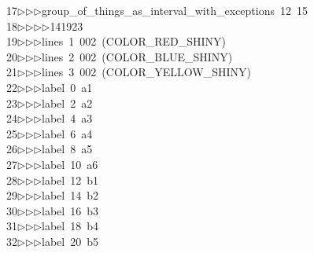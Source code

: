 \begin{tabbing}
17\>$\triangleright$\>$\triangleright$\>$\triangleright$\>group\_of\_things\_as\_interval\_with\_exceptions\ 12\ 15\ \\[0pt]
18\>$\triangleright$\>$\triangleright$\>$\triangleright$\>$\triangleright$\>141923\ \\[0pt]
19\>$\triangleright$\>$\triangleright$\>$\triangleright$\>lines\ 1\ 002\ (COLOR\_RED\_SHINY)\ \\[0pt]
20\>$\triangleright$\>$\triangleright$\>$\triangleright$\>lines\ 2\ 002\ (COLOR\_BLUE\_SHINY)\ \\[0pt]
21\>$\triangleright$\>$\triangleright$\>$\triangleright$\>lines\ 3\ 002\ (COLOR\_YELLOW\_SHINY)\ \\[0pt]
22\>$\triangleright$\>$\triangleright$\>$\triangleright$\>label\ 0\ a1\ \\[0pt]
23\>$\triangleright$\>$\triangleright$\>$\triangleright$\>label\ 2\ a2\ \\[0pt]
24\>$\triangleright$\>$\triangleright$\>$\triangleright$\>label\ 4\ a3\ \\[0pt]
25\>$\triangleright$\>$\triangleright$\>$\triangleright$\>label\ 6\ a4\ \\[0pt]
26\>$\triangleright$\>$\triangleright$\>$\triangleright$\>label\ 8\ a5\ \\[0pt]
27\>$\triangleright$\>$\triangleright$\>$\triangleright$\>label\ 10\ a6\ \\[0pt]
28\>$\triangleright$\>$\triangleright$\>$\triangleright$\>label\ 12\ b1\ \\[0pt]
29\>$\triangleright$\>$\triangleright$\>$\triangleright$\>label\ 14\ b2\ \\[0pt]
30\>$\triangleright$\>$\triangleright$\>$\triangleright$\>label\ 16\ b3\ \\[0pt]
31\>$\triangleright$\>$\triangleright$\>$\triangleright$\>label\ 18\ b4\ \\[0pt]
32\>$\triangleright$\>$\triangleright$\>$\triangleright$\>label\ 20\ b5\ \\[0pt]

\end{tabbing}
